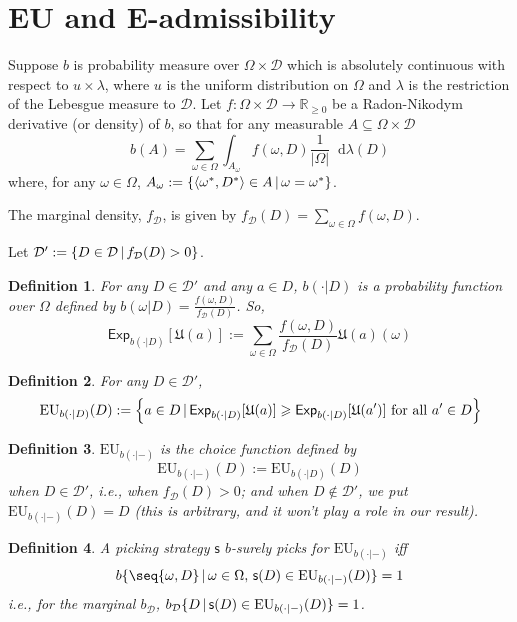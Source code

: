 \documentclass[a4paper]{article}
\newtheorem{definition}{Definition}
\newcommand\D{\mathcal{D}}
\newcommand\s{\mathsf{s}}
\newcommand\Exp{\mathsf{Exp}}
\newcommand\EU{\mathrm{EU}}
\newcommand\U{\mathfrak{U}} %
\newcommand{\pb}{b}
\newcommand\SetDelimiter[1][]{
	\nonscript\,#1\vert \allowbreak \nonscript\,\mathopen{}}
\providecommand\given{\SetDelimiter}
\newcommand*\diff{\mathop{}\!\mathrm{d}}
\renewcommand{\geq}{\geqslant}
\newenvironment{CCM rewritten}
{\begingroup\color{blue}} %
{\endgroup}              %
\begin{document}
\section{EU and E-admissibility}



Suppose $b$ is probability measure over $\Omega\times\D$ which is absolutely continuous with respect to $u\times\lambda$, where $u$ is the uniform distribution on $\Omega$ and $\lambda$ is the restriction of the Lebesgue measure to $\D$. Let $f:\Omega\times\D\rightarrow\mathbb{R}_{\geq0}$ be a Radon-Nikodym derivative (or density) of $b$, so that for any measurable $A\subseteq\Omega\times\D$
\[
b(A)=\sum_{\omega\in\Omega}\int_{A_\omega} f(\omega,D) \frac{1}{|\Omega|}\diff\lambda(D)
\]
where, for any $\omega\in\Omega$, $A_\omega:=\left\{\left<\omega^*,D^*\right>\in A\given \omega=\omega^*\right\}$.

The marginal density, $f_\D$, is given by $f_\D(D)=\sum_{\omega\in\Omega}f(\omega,D)$. 

	
Let $\D':=\{D\in\D\given f_\D(D)>0\}$.

\begin{definition}
	For any $D\in\D'$ and any $a\in D$, $\pb(\cdot|D)$ is a probability function over $\Omega$ defined by $\pb(\omega|D)=\frac{f(\omega,D)}{f_\D(D)}$. 
	So,  \[\Exp_{\pb(\cdot|D)}[\U(a)]:=\displaystyle\sum_{\omega\in\Omega}\frac{f(\omega,D)}{f_\D(D)}\U(a)(\omega)\]
\end{definition}
	
	
\begin{definition}
	For any $D\in\D'$, \[\EU_{\pb(\cdot|D)}(D):=\left\{a\in D\given \Exp_{\pb(\cdot|D)}[\U(a)]\geq\Exp_{\pb(\cdot|D)}[\U(a')]\text{ for all $a'\in D$}\right\}\]
\end{definition}

	
\begin{definition}
	$\EU_{\pb(\cdot|-)}$ is the choice function defined by \[\EU_{\pb(\cdot|-)}(D):=\EU_{\pb(\cdot|D)}(D)\]when $D\in\D'$, i.e., when $f_\D(D)>0$; and when $D\notin\D'$, we put $\EU_{\pb(\cdot|-)}(D)=D$ (this is arbitrary, and it won't play a role in our result). 
\end{definition}

\begin{definition}
A picking strategy $\s$ \emph{$\pb$-surely picks for $\EU_{\pb(\cdot|-)}$} iff \[\pb\{\seq{\omega,D}\given\omega\in\Omega,\, \s(D)\in \EU_{\pb(\cdot|-)}(D)\}=1\] i.e., for the marginal $\pb_\D$, $\pb_\D\{D\given \s(D)\in\EU_{\pb(\cdot|-)}(D)\}=1$.
\end{definition}
\end{document}

